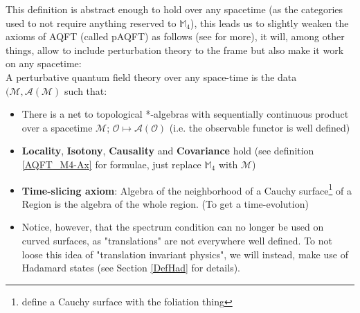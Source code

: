 \documentclass[a4paper,11pt]{article}
\numberwithin{equation}{section}
\theoremstyle{definition}
\newtheorem{comment}{Comment}
\begin{document}
This definition is abstract enough to hold over any spacetime (as the categories used to not require anything reserved to $\mathbb{M}_4$), this leads us to slightly weaken the axioms of AQFT (called pAQFT) as follows (see \cite{pAQFT} for more), it will, among other things, allow to include perturbation theory to the frame but also make it work on any spacetime:\\
A perturbative quantum field theory over any space-time is the data $(\mathcal{M},\mathcal{A}(\mathcal{M})$ such that:
\begin{itemize}
    \item There is a net to topological *-algebras with sequentially continuous product over a spacetime $\mathcal{M}$; $\mathcal{O}\mapsto\mathcal{A}(\mathcal{O})$ (i.e. the observable functor is well defined)
    \item \textbf{Locality}, \textbf{Isotony}, \textbf{Causality} and \textbf{Covariance} hold (see definition \ref{AQFT_M4-Ax} for formulae, just replace $\mathbb{M}_4$ with $\mathcal{M}$)
    \item \textbf{Time-slicing axiom}: Algebra of the neighborhood of a Cauchy surface\footnote{\color{red} define a Cauchy surface with the foliation thing \color{black}} of a Region is the algebra of the whole region. (To get a time-evolution)
    \item Notice, however, that the spectrum condition can no longer be used on curved surfaces, as "translations" are not everywhere well defined. To not loose this idea of "translation invariant physics", we will instead, make use of Hadamard states \label{FirstMentionHad}(see Section \ref{DefHad} for details).
\end{itemize}

\end{document}
